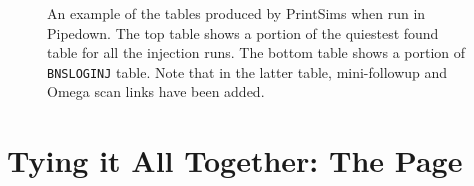 \begin{figure}[p]
\center
{}
\label{fig:sample-printsims}
\caption{An example of the tables produced by PrintSims when run in Pipedown. The top table shows a portion of the quiestest found table for all the injection runs. The bottom table shows a portion of \texttt{BNSLOGINJ} table. Note that in the latter table, mini-followup and Omega scan links have been added.}
\end{figure}

\clearpage

\section{Tying it All Together: The \ihope Page}
\label{sec:ihope_page}

